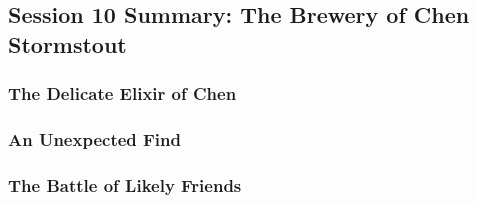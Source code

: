 \subsection{Session 10 Summary: The Brewery of Chen Stormstout}

\subsubsection{The Delicate Elixir of Chen}



\subsubsection{An Unexpected Find}



\subsubsection{The Battle of Likely Friends}


